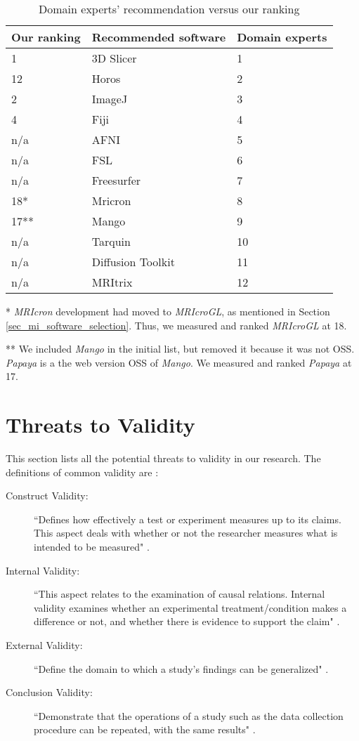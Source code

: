 \begin{table}[H]
\centering
\begin{tabular}{lll}
\hline
Our ranking & Recommended software & Domain experts \\ \hline
1 & 3D Slicer & 1 \\
12 & Horos & 2 \\
2 & ImageJ & 3 \\
4 & Fiji & 4 \\
n/a & AFNI & 5 \\
n/a & FSL & 6 \\
n/a & Freesurfer & 7 \\
18* & Mricron & 8 \\
17** & Mango & 9 \\
n/a & Tarquin & 10 \\
n/a & Diffusion Toolkit & 11 \\
n/a & MRItrix & 12 \\ \hline
\end{tabular}
\caption{\label{tab_experts_vs_top_software}Domain experts' recommendation versus our ranking}
\end{table}

* \textit{MRIcron} development had moved to \textit{MRIcroGL}, as mentioned in Section \ref{sec_mi_software_selection}. Thus, we measured and ranked \textit{MRIcroGL} at 18.

** We included \textit{Mango} in the initial list, but removed it because it was not OSS. \textit{Papaya} is a the web version OSS of \textit{Mango}. We measured and ranked \textit{Papaya} at 17.

\section{Threats to Validity}
\label{sec_threats_to_validity}

This section lists all the potential threats to validity in our research. The definitions of common validity are \cite{AmpatzoglouEtAl2019}\cite{ZhouEtAl2016}:
\begin{description}
\item[Construct Validity:] ``Deﬁnes how eﬀectively a test or experiment measures up to its claims. This aspect deals with whether or not the researcher measures what is intended to be measured" \cite{AmpatzoglouEtAl2019}.
\item[Internal Validity:] ``This aspect relates to the examination of causal relations. Internal validity examines whether an experimental treatment/condition makes a diﬀerence or not, and whether there is evidence to support the claim" \cite{AmpatzoglouEtAl2019}.
\item[External Validity:] ``Define the domain to which a study's findings can be
generalized" \cite{ZhouEtAl2016}.
\item[Conclusion Validity:] ``Demonstrate that the operations of a study such as the data collection procedure can be repeated, with the same results" \cite{ZhouEtAl2016}.
\end{description}

